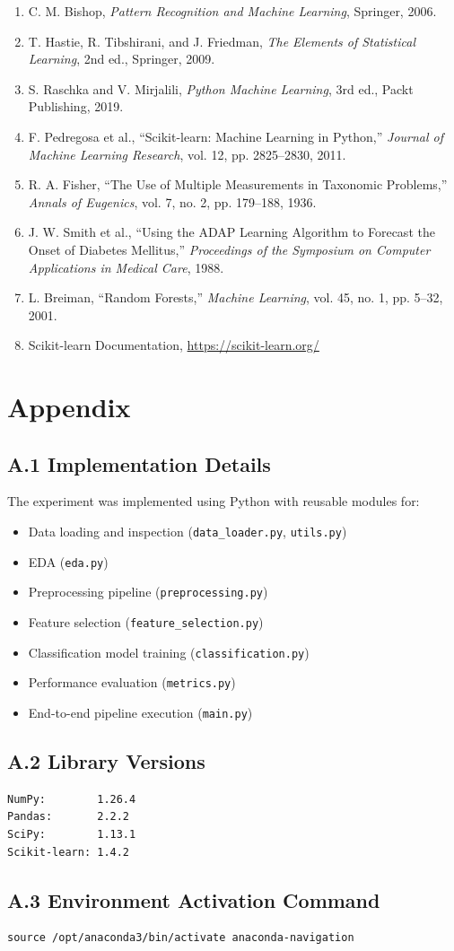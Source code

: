 \documentclass[12pt,a4paper]{article}
\begin{document}
\begin{enumerate}
\item C. M. Bishop, \textit{Pattern Recognition and Machine Learning}, Springer, 2006.
\item T. Hastie, R. Tibshirani, and J. Friedman, \textit{The Elements of Statistical Learning}, 2nd ed., Springer, 2009.
\item S. Raschka and V. Mirjalili, \textit{Python Machine Learning}, 3rd ed., Packt Publishing, 2019.
\item F. Pedregosa et al., ``Scikit-learn: Machine Learning in Python,'' \textit{Journal of Machine Learning Research}, vol. 12, pp. 2825--2830, 2011.
\item R. A. Fisher, ``The Use of Multiple Measurements in Taxonomic Problems,'' \textit{Annals of Eugenics}, vol. 7, no. 2, pp. 179--188, 1936.
\item J. W. Smith et al., ``Using the ADAP Learning Algorithm to Forecast the Onset of Diabetes Mellitus,'' \textit{Proceedings of the Symposium on Computer Applications in Medical Care}, 1988.
\item L. Breiman, ``Random Forests,'' \textit{Machine Learning}, vol. 45, no. 1, pp. 5--32, 2001.
\item Scikit-learn Documentation, \url{https://scikit-learn.org/}
\end{enumerate}

\section*{Appendix}

\subsection*{A.1 Implementation Details}

The experiment was implemented using Python with reusable modules for:
\begin{itemize}
\item Data loading and inspection (\texttt{data\_loader.py}, \texttt{utils.py})
\item EDA (\texttt{eda.py})
\item Preprocessing pipeline (\texttt{preprocessing.py})
\item Feature selection (\texttt{feature\_selection.py})
\item Classification model training (\texttt{classification.py})
\item Performance evaluation (\texttt{metrics.py})
\item End-to-end pipeline execution (\texttt{main.py})
\end{itemize}

\subsection*{A.2 Library Versions}

\begin{lstlisting}
NumPy:        1.26.4
Pandas:       2.2.2
SciPy:        1.13.1
Scikit-learn: 1.4.2
\end{lstlisting}

\subsection*{A.3 Environment Activation Command}

\begin{lstlisting}
source /opt/anaconda3/bin/activate anaconda-navigation
\end{lstlisting}
\end{document}
